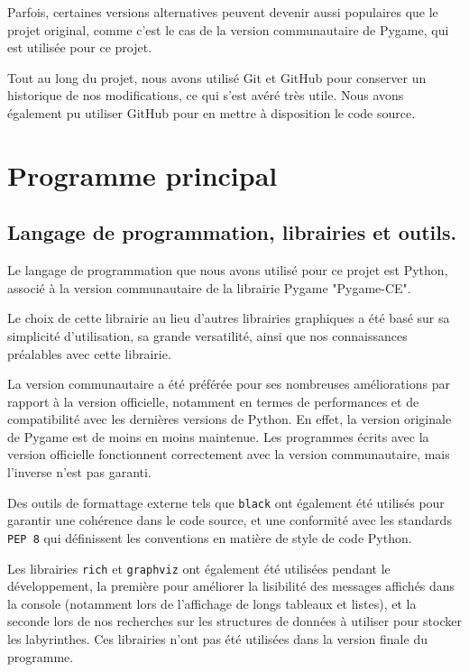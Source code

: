 \documentclass[12pt]{scrreprt} %
\begin{document}
Parfois, certaines versions alternatives peuvent devenir aussi populaires que le projet original, comme c'est le cas de la version communautaire de Pygame, qui est utilisée pour ce projet.

Tout au long du projet, nous avons utilisé Git et GitHub pour conserver un historique de nos modifications, ce qui s'est avéré très utile. Nous avons également pu utiliser GitHub pour en mettre à disposition le code source.

\section{Programme principal}

\subsection{Langage de programmation, librairies et outils.}

Le langage de programmation que nous avons utilisé pour ce projet est Python, associé à la version communautaire de la librairie Pygame "Pygame-CE"\cite{PygameGithub2024}.

Le choix de cette librairie au lieu d'autres librairies graphiques a été basé sur sa simplicité d'utilisation, sa grande versatilité, ainsi que nos connaissances préalables avec cette librairie.

La version communautaire a été préférée pour ses nombreuses améliorations par rapport à la version officielle, notamment en termes de performances et de compatibilité avec les dernières versions de Python. En effet, la version originale de Pygame est de moins en moins maintenue. Les programmes écrits avec la version officielle fonctionnent correctement avec la version communautaire, mais l'inverse n'est pas garanti.

Des outils de formattage externe tels que \texttt{black}\cite{Black2024} ont également été utilisés pour garantir une cohérence dans le code source, et une conformité avec les standards \texttt{PEP 8}\cite{PEP82024} qui définissent les conventions en matière de style de code Python.

Les librairies \texttt{rich} et \texttt{graphviz} ont également été utilisées pendant le développement, la première pour améliorer la lisibilité des messages affichés dans la console (notamment lors de l'affichage de longs tableaux et listes), et la seconde lors de nos recherches sur les structures de données à utiliser pour stocker les labyrinthes. Ces librairies n'ont pas été utilisées dans la version finale du programme.
\end{document}
